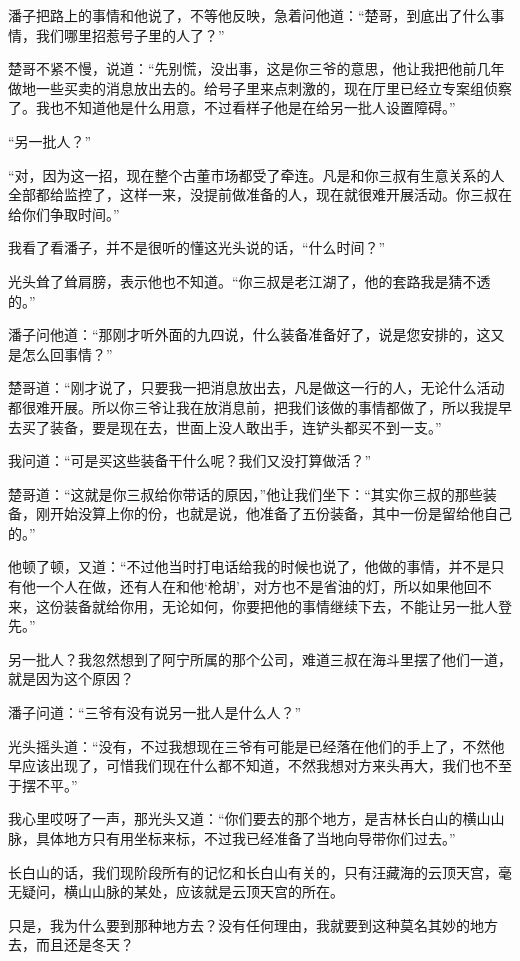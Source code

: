 潘子把路上的事情和他说了，不等他反映，急着问他道：“楚哥，到底出了什么事情，我们哪里招惹号子里的人了？”

楚哥不紧不慢，说道：“先别慌，没出事，这是你三爷的意思，他让我把他前几年做地一些买卖的消息放出去的。给号子里来点刺激的，现在厅里已经立专案组侦察了。我也不知道他是什么用意，不过看样子他是在给另一批人设置障碍。”

“另一批人？”

“对，因为这一招，现在整个古董市场都受了牵连。凡是和你三叔有生意关系的人全部都给监控了，这样一来，没提前做准备的人，现在就很难开展活动。你三叔在给你们争取时间。”

我看了看潘子，并不是很听的懂这光头说的话，“什么时间？”

光头耸了耸肩膀，表示他也不知道。“你三叔是老江湖了，他的套路我是猜不透的。”

潘子问他道：“那刚才听外面的九四说，什么装备准备好了，说是您安排的，这又是怎么回事情？”

楚哥道：“刚才说了，只要我一把消息放出去，凡是做这一行的人，无论什么活动都很难开展。所以你三爷让我在放消息前，把我们该做的事情都做了，所以我提早去买了装备，要是现在去，世面上没人敢出手，连铲头都买不到一支。”

我问道：“可是买这些装备干什么呢？我们又没打算做活？”

楚哥道：“这就是你三叔给你带话的原因，”他让我们坐下：“其实你三叔的那些装备，刚开始没算上你的份，也就是说，他准备了五份装备，其中一份是留给他自己的。”

他顿了顿，又道：“不过他当时打电话给我的时候也说了，他做的事情，并不是只有他一个人在做，还有人在和他‘枪胡’，对方也不是省油的灯，所以如果他回不来，这份装备就给你用，无论如何，你要把他的事情继续下去，不能让另一批人登先。”

另一批人？我忽然想到了阿宁所属的那个公司，难道三叔在海斗里摆了他们一道，就是因为这个原因？

潘子问道：“三爷有没有说另一批人是什么人？”

光头摇头道：“没有，不过我想现在三爷有可能是已经落在他们的手上了，不然他早应该出现了，可惜我们现在什么都不知道，不然我想对方来头再大，我们也不至于摆不平。”

我心里哎呀了一声，那光头又道：“你们要去的那个地方，是吉林长白山的横山山脉，具体地方只有用坐标来标，不过我已经准备了当地向导带你们过去。”

长白山的话，我们现阶段所有的记忆和长白山有关的，只有汪藏海的云顶天宫，毫无疑问，横山山脉的某处，应该就是云顶天宫的所在。

只是，我为什么要到那种地方去？没有任何理由，我就要到这种莫名其妙的地方去，而且还是冬天？

